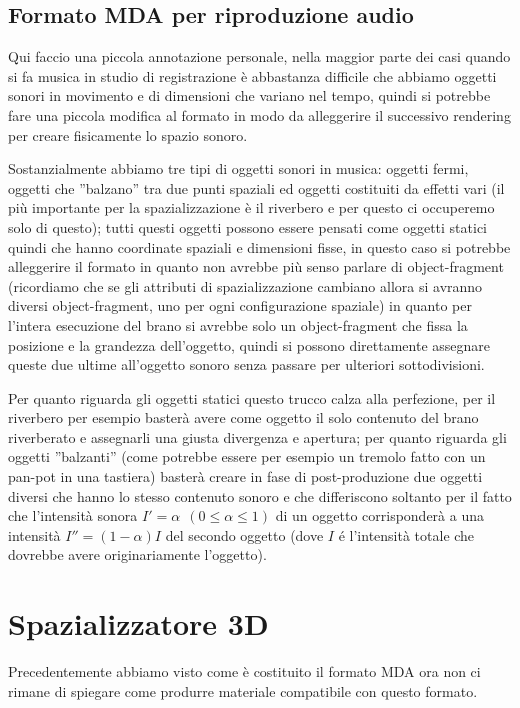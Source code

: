 \documentclass[12pt,a4paper]{report}
\begin{document}
\subsection{Formato MDA per riproduzione audio}

Qui faccio una piccola annotazione personale, nella maggior parte dei casi quando si fa musica in studio di registrazione è abbastanza difficile che abbiamo oggetti sonori in movimento e di dimensioni che variano nel tempo, quindi si potrebbe fare una piccola modifica al formato in modo da alleggerire il successivo rendering per creare fisicamente lo spazio sonoro.

Sostanzialmente abbiamo tre tipi di oggetti sonori in musica: oggetti fermi, oggetti che ''balzano'' tra due punti spaziali ed oggetti costituiti da effetti vari (il più importante per la spazializzazione è il riverbero e per questo ci occuperemo solo di questo); tutti questi oggetti possono essere pensati come oggetti statici quindi che hanno coordinate spaziali e dimensioni fisse, in questo caso si potrebbe alleggerire il formato in quanto non avrebbe più senso parlare di object-fragment (ricordiamo che se gli attributi di spazializzazione cambiano allora si avranno diversi object-fragment, uno per ogni configurazione spaziale) in quanto per l'intera esecuzione del brano si avrebbe solo un object-fragment che fissa la posizione e la grandezza dell'oggetto, quindi si possono direttamente assegnare queste due ultime all'oggetto sonoro senza passare per ulteriori sottodivisioni.

Per quanto riguarda gli oggetti statici questo trucco calza alla perfezione, per il riverbero per esempio basterà avere come oggetto il solo contenuto del brano riverberato e assegnarli una giusta divergenza e apertura; per quanto riguarda gli oggetti ''balzanti'' (come potrebbe essere per esempio un tremolo fatto con un pan-pot in una tastiera) basterà creare in fase di post-produzione due oggetti diversi che hanno lo stesso contenuto sonoro e che differiscono soltanto per il fatto che l'intensità sonora $I'=\alpha \ \ (0\leq \alpha \leq 1)$ di un oggetto corrisponderà a una intensità $I''=(1-\alpha) I$ del secondo oggetto (dove $I$ é l'intensità totale che dovrebbe avere originariamente l'oggetto).

\section{Spazializzatore 3D}

Precedentemente abbiamo visto come è costituito il formato MDA ora non ci rimane di spiegare come produrre materiale compatibile con questo formato.
\end{document}
